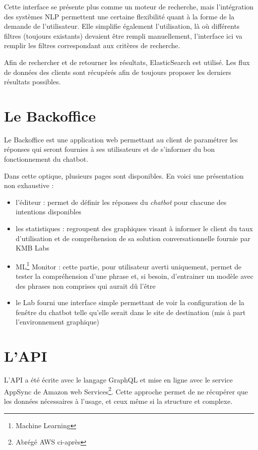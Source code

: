 \documentclass[12pt,a4paper,oneside]{scrreprt}
\begin{document}
Cette interface se présente plus comme un moteur de recherche, mais l'intégration des systèmes NLP permettent une certaine flexibilité quant à la forme de la demande de l'utilisateur. Elle simplifie également l'utilisation, là où différents filtres (toujours existants) devaient être rempli manuellement, l'interface ici va remplir les filtres correspondant aux critères de recherche.

\begin{info}
	Afin de rechercher et de retourner les résultats, ElasticSearch est utilisé. Les flux de données des clients sont récupérés afin de toujours proposer les derniers résultats possibles.
\end{info}

\section{Le Backoffice}

Le Backoffice est une application web permettant au client de paramétrer les réponses qui seront fournies à ses utilisateurs et de s'informer du bon fonctionnement du chatbot.

Dans cette optique, plusieurs pages sont disponibles. En voici une présentation non exhaustive :
\begin{itemize}
\item l'éditeur : permet de définir les réponses du \textit{chatbot} pour chacune des intentions disponibles
\item les statistiques : regroupent des graphiques visant à informer le client du taux d'utilisation et de compréhension de sa solution conversationnelle fournie par KMB Labs
\item ML\footnote{Machine Learning} Monitor : cette partie, pour utilisateur averti uniquement, permet de tester la compréhension d'une phrase et, si besoin, d'entrainer un modèle avec des phrases non comprises qui aurait dû l'être
\item le Lab fourni une interface simple permettant de voir la configuration de la fenêtre du chatbot telle qu'elle serait dans le site de destination (mis à part l'environnement graphique)
\end{itemize}

\section{L'API}

L'API a été écrite avec le langage GraphQL et mise en ligne avec le service AppSync de Amazon web Services\footnote{Abrégé \og AWS\fg{} ci-après}. Cette approche permet de ne récupérer que les données nécessaires  à l'usage, et ceux même si la structure et complexe.
\end{document}
